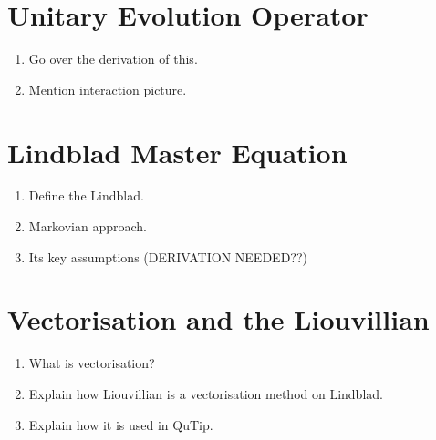 \documentclass{article}
\begin{document}
\begin{appendices}
    \section{Unitary Evolution Operator}
    \begin{enumerate}
        \item Go over the derivation of this. 
        \item Mention interaction picture. 
    \end{enumerate}
    \section{Lindblad Master Equation}
    \begin{enumerate}
        \item Define the Lindblad.
        \item Markovian approach. 
        \item Its key assumptions (DERIVATION NEEDED??)
    \end{enumerate}
    \section{Vectorisation and the Liouvillian}
    \begin{enumerate}
        \item What is vectorisation?
        \item Explain how Liouvillian is a vectorisation method on Lindblad. 
        \item Explain how it is used in QuTip. 
    \end{enumerate}
\end{appendices}
\newpage

 
 
\end{document}
